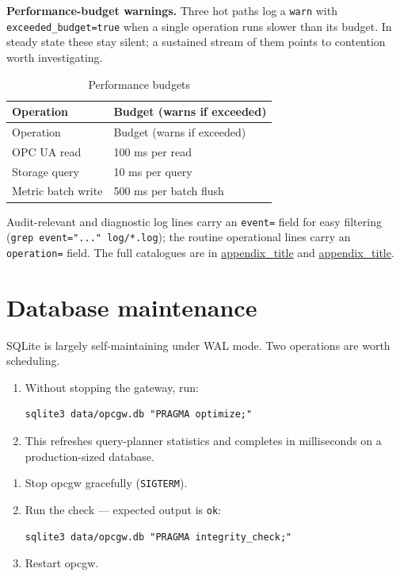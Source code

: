 \textbf{Performance-budget warnings.} Three hot paths log a \texttt{warn} with \texttt{exceeded\_budget=true} when a single operation runs slower than its budget. In steady state these stay silent; a sustained stream of them points to contention worth investigating.

\begin{longtable}[]{@{}ll@{}}
\caption{Performance budgets}\tabularnewline
\toprule\noalign{}
Operation & Budget (warns if exceeded) \\
\midrule\noalign{}
\endfirsthead
\toprule\noalign{}
Operation & Budget (warns if exceeded) \\
\midrule\noalign{}
\endhead
\bottomrule\noalign{}
\endlastfoot
OPC UA read & 100 ms per read \\
Storage query & 10 ms per query \\
Metric batch write & 500 ms per batch flush \\
\end{longtable}

Audit-relevant and diagnostic log lines carry an \texttt{event=} field for easy filtering (\texttt{grep\ \textquotesingle{}event="..."\textquotesingle{}\ log/*.log}); the routine operational lines carry an \texttt{operation=} field. The full catalogues are in \hyperref[app-operation-names]{appendix\_title} and \hyperref[app-audit-events]{appendix\_title}.

\section{Database maintenance}\label{sec-database-maintenance}

SQLite is largely self-maintaining under WAL mode. Two operations are worth scheduling.

\begin{enumerate}
\item
  Without stopping the gateway, run:

\begin{lstlisting}
sqlite3 data/opcgw.db "PRAGMA optimize;"
\end{lstlisting}
\item
  This refreshes query-planner statistics and completes in milliseconds on a production-sized database.
\end{enumerate}

\begin{enumerate}
\item
  Stop opcgw gracefully (\texttt{SIGTERM}).
\item
  Run the check --- expected output is \texttt{ok}:

\begin{lstlisting}
sqlite3 data/opcgw.db "PRAGMA integrity_check;"
\end{lstlisting}
\item
  Restart opcgw.
\end{enumerate}

